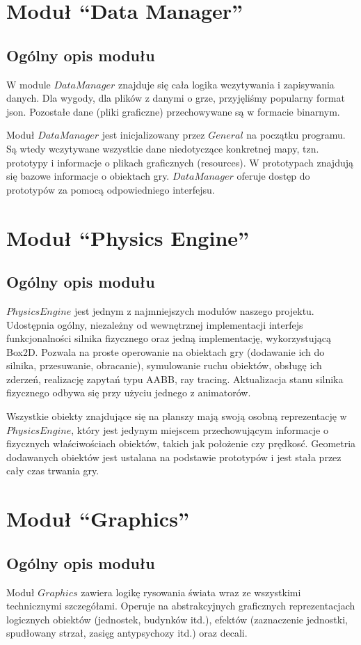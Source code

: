 \documentclass[licencjacka]{pracamgr}
\begin{document}
  \section{Moduł ``Data Manager''}
    \subsection{Ogólny opis modułu}
      W module $DataManager$ znajduje się cała logika wczytywania i zapisywania danych. Dla wygody, dla plików z
      danymi o grze, przyjęliśmy popularny format json. Pozostałe dane (pliki graficzne) przechowywane są w formacie
      binarnym.

      Moduł $DataManager$ jest inicjalizowany przez $General$ na początku programu. Są wtedy wczytywane wszystkie dane
      niedotyczące konkretnej mapy, tzn. prototypy i informacje o plikach graficznych (resources). W prototypach
      znajdują się bazowe informacje o obiektach gry. $DataManager$ oferuje dostęp do prototypów za pomocą
      odpowiedniego interfejsu.

  \section{Moduł ``Physics Engine''}
    \subsection{Ogólny opis modułu}
    $PhysicsEngine$ jest jednym z najmniejszych modułów naszego projektu. Udostępnia ogólny, niezależny od
    wewnętrznej implementacji interfejs funkcjonalności silnika fizycznego oraz jedną implementację, wykorzystującą Box2D.
    Pozwala na proste operowanie na obiektach gry (dodawanie ich do silnika, przesuwanie, obracanie), symulowanie ruchu obiektów,
    obsługę ich zderzeń, realizację zapytań typu AABB, ray tracing. Aktualizacja stanu silnika fizycznego odbywa się przy użyciu jednego
    z animatorów.

    Wszystkie obiekty znajdujące się na planszy mają swoją osobną reprezentację w $PhysicsEngine$, który jest jedynym miejscem
    przechowującym informacje o fizycznych właściwościach obiektów, takich jak położenie czy prędkosć. Geometria dodawanych obiektów
    jest ustalana na podstawie prototypów i jest stała przez cały czas trwania gry.
  \section{Moduł ``Graphics''}
    \subsection{Ogólny opis modułu}
      Moduł $Graphics$ zawiera logikę rysowania świata wraz ze wszystkimi technicznymi szczegółami. Operuje na
      abstrakcyjnych graficznych reprezentacjach logicznych obiektów (jednostek, budynków itd.), efektów (zaznaczenie
      jednostki, spudłowany strzał, zasięg antypsychozy itd.) oraz decali.
\end{document}
